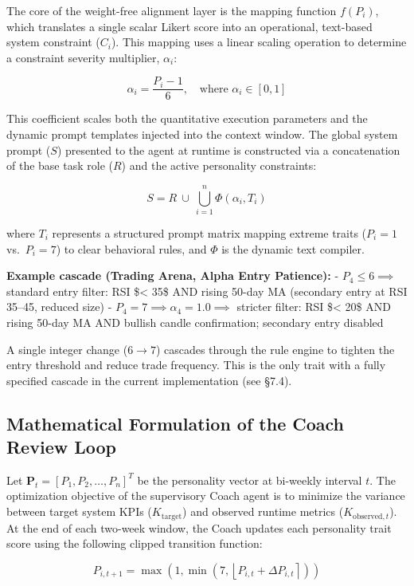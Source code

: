 \documentclass[11pt]{article}
\begin{document}
The core of the weight-free alignment layer is the mapping function \(f(P_i)\), which translates a single scalar Likert score into an operational, text-based system constraint (\(C_i\)). This mapping uses a linear scaling operation to determine a constraint severity multiplier, \(\alpha_i\):

\[\alpha_i = \frac{P_i - 1}{6}, \quad \text{where } \alpha_i \in [0, 1]\]

This coefficient scales both the quantitative execution parameters and the dynamic prompt templates injected into the context window. The global system prompt (\(S\)) presented to the agent at runtime is constructed via a concatenation of the base task role (\(R\)) and the active personality constraints:

\[S = R \ \cup \ \bigcup_{i=1}^{n} \Phi\left(\alpha_i, T_i\right)\]

where \(T_i\) represents a structured prompt matrix mapping extreme traits (\(P_i=1\) vs.~\(P_i=7\)) to clear behavioral rules, and \(\Phi\) is the dynamic text compiler.

\textbf{Example cascade (Trading Arena, Alpha Entry Patience):} - \(P_4 \leq 6 \implies\) standard entry filter: RSI \$\textless{} 35\$ AND rising 50-day MA (secondary entry at RSI 35--45, reduced size) - \(P_4 = 7 \implies \alpha_4 = 1.0 \implies\) stricter filter: RSI \$\textless{} 20\$ AND rising 50-day MA AND bullish candle confirmation; secondary entry disabled

A single integer change (\(6 \to 7\)) cascades through the rule engine to tighten the entry threshold and reduce trade frequency. This is the only trait with a fully specified cascade in the current implementation (see §7.4).

\subsection{Mathematical Formulation of the Coach Review Loop}\label{mathematical-formulation-of-the-coach-review-loop}

Let \(\mathbf{P}_t = [P_1, P_2, \dots, P_n]^T\) be the personality vector at bi-weekly interval \(t\). The optimization objective of the supervisory Coach agent is to minimize the variance between target system KPIs (\(K_{\text{target}}\)) and observed runtime metrics (\(K_{\text{observed}, t}\)). At the end of each two-week window, the Coach updates each personality trait score using the following clipped transition function:

\[P_{i, t+1} = \max\left(1, \min\left(7, \left\lfloor P_{i, t} + \Delta P_{i, t} \right\rceil\right)\right)\]
\end{document}
